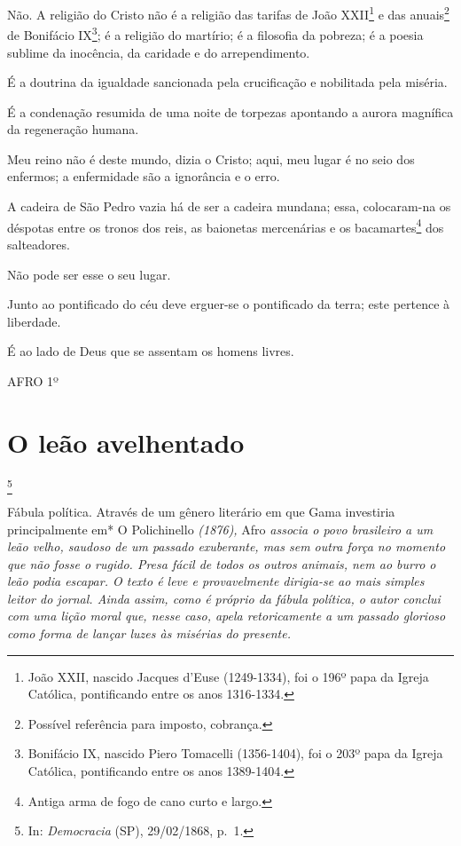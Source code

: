 Não. A religião do Cristo não é a religião das tarifas de João
XXII\footnote{João XXII, nascido Jacques d'Euse (1249-1334), foi o
  196º papa da Igreja Católica, pontificando entre os anos 1316-1334.} e
das anuais\footnote{Possível referência para imposto, cobrança.} de
Bonifácio IX\footnote{Bonifácio IX, nascido Piero Tomacelli
  (1356-1404), foi o 203º papa da Igreja Católica, pontificando entre os
  anos 1389-1404.}; é a religião do martírio; é a filosofia da pobreza;
é a poesia sublime da inocência, da caridade e do arrependimento.

É a doutrina da igualdade sancionada pela crucificação e nobilitada pela
miséria.

É a condenação resumida de uma noite de torpezas apontando a aurora
magnífica da regeneração humana.

Meu reino não é deste mundo, dizia o Cristo; aqui, meu lugar é no seio
dos enfermos; a enfermidade são a ignorância e o erro.

A cadeira de São Pedro vazia há de ser a cadeira mundana; essa,
colocaram-na os déspotas entre os tronos dos reis, as baionetas
mercenárias e os bacamartes\footnote{Antiga arma de fogo de cano curto
  e largo.} dos salteadores.

Não pode ser esse o seu lugar.

Junto ao pontificado do céu deve erguer-se o pontificado da terra; este
pertence à liberdade.

É ao lado de Deus que se assentam os homens livres.

AFRO 1º

\chapter{O leão avelhentado}\footnote{In: \emph{Democracia} (SP),
  29/02/1868, p.~1.}

\begin{didascalia}
Fábula política. Através de um gênero literário em que Gama investiria
principalmente em* O Polichinello \emph{(1876),} Afro \emph{associa o
povo brasileiro a um leão velho, saudoso de um passado exuberante, mas
sem outra força no momento que não fosse o rugido. Presa fácil de todos
os outros animais, nem ao burro o leão podia escapar. O texto é leve e
provavelmente dirigia-se ao mais simples leitor do jornal. Ainda assim,
como é próprio da fábula política, o autor conclui com uma lição moral
que, nesse caso, apela retoricamente a um passado glorioso como forma de
lançar luzes às misérias do presente.}
\end{didascalia}

